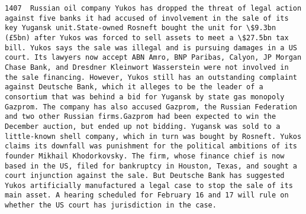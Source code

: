 \documentclass[11pt]{article}
\begin{document}
\begin{Verbatim}[commandchars=\\\{\}]
         1407  Russian oil company Yukos has dropped the threat of legal action against five banks it had accused of involvement in the sale of its key Yugansk unit.State-owned Rosneft bought the unit for \$9.3bn (£5bn) after Yukos was forced to sell assets to meet a \$27.5bn tax bill. Yukos says the sale was illegal and is pursuing damages in a US court. Its lawyers now accept ABN Amro, BNP Paribas, Calyon, JP Morgan Chase Bank, and Dresdner Kleinwort Wasserstein were not involved in the sale financing. However, Yukos still has an outstanding complaint against Deutsche Bank, which it alleges to be the leader of a consortium that was behind a bid for Yugansk by state gas monopoly Gazprom. The company has also accused Gazprom, the Russian Federation and two other Russian firms.Gazprom had been expected to win the December auction, but ended up not bidding. Yugansk was sold to a little-known shell company, which in turn was bought by Rosneft. Yukos claims its downfall was punishment for the political ambitions of its founder Mikhail Khodorkovsky. The firm, whose finance chief is now based in the US, filed for bankruptcy in Houston, Texas, and sought a court injunction against the sale. But Deutsche Bank has suggested Yukos artificially manufactured a legal case to stop the sale of its main asset. A hearing scheduled for February 16 and 17 will rule on whether the US court has jurisdiction in the case.                                                                                                                                                                                                                                                                                                                                                                                                                                                                                                                                                                                                                                                                                                                                                                                                                                                                                                                                                                                                                                                                                                                                                                                                                                                                                                                                                                                                                                                                                                                                                                                                                                                                  

\end{Verbatim}
\end{document}
